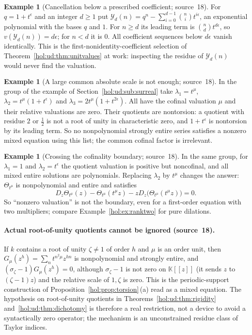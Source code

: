 \documentclass[11pt]{article}
\numberwithin{equation}{section}
\theoremstyle{definition}
\newtheorem{example}[theorem]{Example}
\theoremstyle{remark}
\newcommand{\KK}{\mathbb K}
\begin{document}
\begin{example}[Cancellation below a prescribed coefficient; source~18]
\label{hol:ud:ex:cancellation}
For $q=1+t^\epsilon$ and an integer $d\ge1$ put
$\mathcal Y_d(n)=q^n-\sum_{i=0}^{d-1}\binom nit^{i\epsilon}$, an exponential
polynomial with the bases $q$ and $1$. For $n\ge d$ its leading term is
$\binom ndt^{d\epsilon}$, so $v(\mathcal Y_d(n))=d\epsilon$; for $n<d$ it is
$0$. All coefficient sequences below $d\epsilon$ vanish identically. This is
the first-nonidentity-coefficient selection of
Theorem~\ref{hol:ud:thm:unitvalues} at work: inspecting the residue of
$\mathcal Y_d(n)$ would never find the valuation.
\end{example}

\begin{example}[A large common absolute scale is not enough; source~18]
\label{hol:ud:ex:commonscale}
In the group of the example of Section~\ref{hol:ud:sub:surreal} take
$\lambda_1=t^\mu$, $\lambda_2=t^\mu(1+t^\epsilon)$ and
$\lambda_3=2t^\mu(1+t^{2\epsilon})$. All have the cofinal valuation $\mu$ and
their relative valuations are zero. Their quotients are nontorsion: a
quotient with residue $2$ or $\frac12$ is not a root of unity in
characteristic zero, and $1+t^\epsilon$ is nontorsion by its leading term. So
no nonpolynomial strongly entire series satisfies a nonzero mixed equation
using this list; the common cofinal factor is irrelevant.
\end{example}

\begin{example}[Crossing the cofinality boundary; source~18]
\label{hol:ud:ex:crossing}
In the same group, for $\lambda_1=1$ and $\lambda_2=t^\epsilon$ the quotient
valuation is positive but noncofinal, and all mixed entire solutions are
polynomials. Replacing $\lambda_2$ by $t^\mu$ changes the answer:
$\Theta_{t^\mu}$ is nonpolynomial and entire and satisfies
\[
 D_z\Theta_{t^\mu}(z)-\Theta_{t^\mu}(t^\mu z)
 -zD_z\bigl(\Theta_{t^\mu}(t^\mu z)\bigr)=0 .
\]
So ``nonzero valuation'' is not the boundary, even for a first-order equation
with two multipliers; compare Example~\ref{hol:ex:ranktwo} for pure
dilations.
\end{example}

\paragraph{Actual root-of-unity quotients cannot be ignored (source~18).}
If $k$ contains a root of unity $\zeta\ne1$ of order $h$ and $\mu$ is an order
unit, then $G_\mu(z^h)=\sum_nt^{n^2\mu}z^{hn}$ is nonpolynomial and strongly
entire, and $(\sigma_\zeta-1)G_\mu(z^h)=0$, although $\sigma_\zeta-1$ is not
zero on $\KK[[z]]$ (it sends $z$ to $(\zeta-1)z$) and the relative scale of
$1,\zeta$ is zero. This is the periodic-support construction of
Proposition~\ref{hol:prop:torsion}\,(a) read as a mixed equation. The
hypothesis on root-of-unity quotients in
Theorems~\ref{hol:ud:thm:rigidity} and~\ref{hol:ud:thm:dichotomy} is therefore a
real restriction, not a device to avoid a syntactically zero operator; the
mechanism is an unconstrained residue class of Taylor indices.
\end{document}
